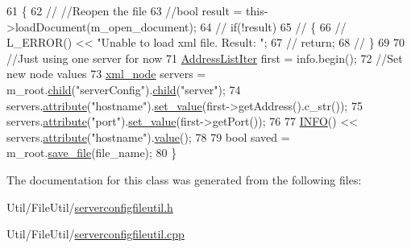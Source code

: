 \begin{DoxyCode}
61 \{
62 \textcolor{comment}{//    //Reopen the file}
63     \textcolor{comment}{//bool result = this->loadDocument(m\_open\_document);}
64 \textcolor{comment}{//    if(!result)}
65 \textcolor{comment}{//    \{}
66 \textcolor{comment}{//        L\_ERROR() << "Unable to load xml file. Result: ";}
67 \textcolor{comment}{//        return;}
68 \textcolor{comment}{//    \}}
69 
70     \textcolor{comment}{//Just using one server for now}
71     \hyperlink{serverconfigfileutil_8h_aa849a66e29fe72431879f7d9d8ccda63}{AddressListIter} first = info.begin();
72     \textcolor{comment}{//Set new node values}
73     \hyperlink{classpugi_1_1xml__node}{xml\_node} servers = m\_root.\hyperlink{classpugi_1_1xml__node_af3aa192b114a289640110c9e4da020ca}{child}(\textcolor{stringliteral}{"serverConfig"}).\hyperlink{classpugi_1_1xml__node_af3aa192b114a289640110c9e4da020ca}{child}(\textcolor{stringliteral}{"server"});
74     servers.\hyperlink{classpugi_1_1xml__node_a19fc1a285c0f751f52c0e151a727de97}{attribute}(\textcolor{stringliteral}{"hostname"}).\hyperlink{classpugi_1_1xml__attribute_af2ca1f0d13ee8f661bc17524bedc13d7}{set\_value}(first->getAddress().c\_str());
75     servers.\hyperlink{classpugi_1_1xml__node_a19fc1a285c0f751f52c0e151a727de97}{attribute}(\textcolor{stringliteral}{"port"}).\hyperlink{classpugi_1_1xml__attribute_af2ca1f0d13ee8f661bc17524bedc13d7}{set\_value}(first->getPort());
76 
77     \hyperlink{Log_8h_a7cec51f4ce4b22e8c0f256485d57fca7}{INFO}() << servers.\hyperlink{classpugi_1_1xml__node_a19fc1a285c0f751f52c0e151a727de97}{attribute}(\textcolor{stringliteral}{"hostname"}).\hyperlink{classpugi_1_1xml__attribute_ad535b73777f3eaa1c0c0a3c168683bd3}{value}();
78 
79     \textcolor{keywordtype}{bool} saved = m\_root.\hyperlink{classpugi_1_1xml__document_ac67294573cbaa41d3e6210480a9f7f99}{save\_file}(file\_name);
80 \}
\end{DoxyCode}


The documentation for this class was generated from the following files\-:\begin{DoxyCompactItemize}
\item 
Util/\-File\-Util/\hyperlink{serverconfigfileutil_8h}{serverconfigfileutil.\-h}\item 
Util/\-File\-Util/\hyperlink{serverconfigfileutil_8cpp}{serverconfigfileutil.\-cpp}\end{DoxyCompactItemize}
